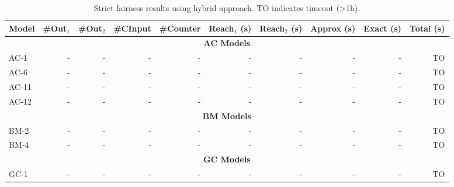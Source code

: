 \begin{table}[htbp]
\centering
\begin{tabular}{|l|r|r|r|r|r|r|r|r|r|}
\hline
Model & \#Out$_1$ & \#Out$_2$ & \#CInput & \#Counter & Reach$_1$ (s) & Reach$_2$ (s) & Approx (s) & Exact (s) & Total (s) \\
\hline
\multicolumn{10}{|c|}{\textbf{AC Models}} \\
\hline
AC-1 & - & - & - & - & - & - & - & - & TO \\
AC-6 & - & - & - & - & - & - & - & - & TO \\
AC-11 & - & - & - & - & - & - & - & - & TO \\
AC-12 & - & - & - & - & - & - & - & - & TO \\
\hline
\multicolumn{10}{|c|}{\textbf{BM Models}} \\
\hline
BM-2 & - & - & - & - & - & - & - & - & TO \\
BM-4 & - & - & - & - & - & - & - & - & TO \\
\hline
\multicolumn{10}{|c|}{\textbf{GC Models}} \\
\hline
GC-1 & - & - & - & - & - & - & - & - & TO \\
\hline
\end{tabular}
\caption{Strict fairness results using hybrid approach. TO indicates timeout (>1h).}
\label{tab:strict_fair_hybrid}
\end{table}